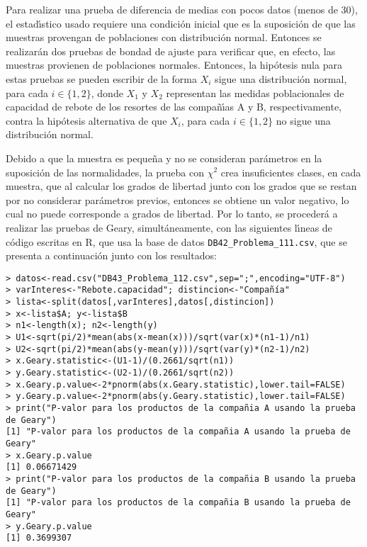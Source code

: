 \begin{solucion}
 Para realizar una prueba de diferencia de medias con pocos datos
 (menos de 30), el estad\'{\i}stico usado requiere una condici\'on inicial
 que es la suposici\'on de que las muestras provengan de poblaciones
 con distribuci\'on normal.
 Entonces se realizar\'an dos pruebas de bondad de ajuste
 para verificar que, en efecto, las muestras provienen de poblaciones
 normales. Entonces, la hip\'otesis nula para estas pruebas se pueden
 escribir de la forma
 $X_i$ sigue una distribuci\'on normal, para cada $i \in \{1,2\}$,
 donde $X_1$ y $X_2$ representan las medidas poblacionales de capacidad
 de rebote de los resortes de las compa\~n\'{\i}as A y B,
 respectivamente, contra la hip\'otesis alternativa
 de que $X_i$, para cada $i \in \{1,2\}$ no sigue una distribuci\'on
 normal.
 \par 
 Debido a que la muestra es peque\~na y no se consideran par\'ametros
 en la suposici\'on de las normalidades,
 la prueba con $\chi^2$ crea insuficientes clases, en cada muestra,
 que al calcular los grados de libertad junto con los grados que se restan
 por no considerar par\'ametros previos, entonces se obtiene
 un valor negativo, lo cual no puede corresponde a grados de libertad.
 Por lo tanto, se proceder\'a a realizar las pruebas de Geary,
 simult\'aneamente, con las siguientes l\'{\i}neas de c\'odigo
 escritas en R, que usa la base de datos
 \texttt{DB42\_Problema\_111.csv},
 que se presenta a continuaci\'on junto con los resultados:
 \begin{verbatim}
> datos<-read.csv("DB43_Problema_112.csv",sep=";",encoding="UTF-8")
> varInteres<-"Rebote.capacidad"; distincion<-"Compañía"
> lista<-split(datos[,varInteres],datos[,distincion])
> x<-lista$A; y<-lista$B
> n1<-length(x); n2<-length(y)
> U1<-sqrt(pi/2)*mean(abs(x-mean(x)))/sqrt(var(x)*(n1-1)/n1)
> U2<-sqrt(pi/2)*mean(abs(y-mean(y)))/sqrt(var(y)*(n2-1)/n2)
> x.Geary.statistic<-(U1-1)/(0.2661/sqrt(n1))
> y.Geary.statistic<-(U2-1)/(0.2661/sqrt(n2))
> x.Geary.p.value<-2*pnorm(abs(x.Geary.statistic),lower.tail=FALSE)
> y.Geary.p.value<-2*pnorm(abs(y.Geary.statistic),lower.tail=FALSE)
> print("P-valor para los productos de la compañia A usando la prueba de Geary")
[1] "P-valor para los productos de la compañia A usando la prueba de Geary"
> x.Geary.p.value
[1] 0.06671429
> print("P-valor para los productos de la compañia B usando la prueba de Geary")
[1] "P-valor para los productos de la compañia B usando la prueba de Geary"
> y.Geary.p.value
[1] 0.3699307
 \end{verbatim}

\end{solucion}
